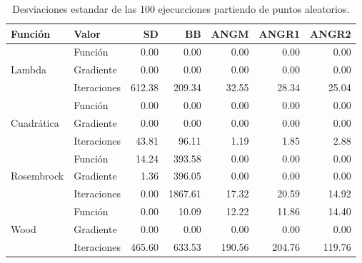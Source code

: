 \begin{table}[H]
    \small
    \centering
    \begin{tabular}{llrrrrr}
        \hline
        \textbf{Función} & \textbf{Valor} & \textbf{SD} & \textbf{BB} & \textbf{ANGM} & \textbf{ANGR1} & \textbf{ANGR2} \\[0.1cm]\hline
                         & Función        & 0.00        & 0.00        & 0.00          & 0.00           & 0.00           \\
        Lambda           & Gradiente      & 0.00        & 0.00        & 0.00          & 0.00           & 0.00           \\
                         & Iteraciones    & 612.38      & 209.34      & 32.55         & 28.34          & 25.04          \\\hline
                         & Función        & 0.00        & 0.00        & 0.00          & 0.00           & 0.00           \\
        Cuadrática       & Gradiente      & 0.00        & 0.00        & 0.00          & 0.00           & 0.00           \\
                         & Iteraciones    & 43.81       & 96.11       & 1.19          & 1.85           & 2.88           \\\hline
                         & Función        & 14.24       & 393.58      & 0.00          & 0.00           & 0.00           \\
        Rosembrock       & Gradiente      & 1.36        & 396.05      & 0.00          & 0.00           & 0.00           \\
                         & Iteraciones    & 0.00        & 1867.61     & 17.32         & 20.59          & 14.92          \\\hline
                         & Función        & 0.00        & 10.09       & 12.22         & 11.86          & 14.40          \\
        Wood             & Gradiente      & 0.00        & 0.00        & 0.00          & 0.00           & 0.00           \\
                         & Iteraciones    & 465.60      & 633.53      & 190.56        & 204.76         & 119.76         \\\hline
    \end{tabular}
    \caption{Desviaciones estandar de las 100 ejecucciones partiendo de puntos aleatorios.}
    \label{table:deviation}
\end{table}
